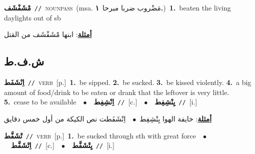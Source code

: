 \documentclass[10pt,a4paper,twoside]{article} %
\begin{document}
\begin{multicols}{2}
{\setlength\topsep{0pt}\textbf{\foreignlanguage{arabic}{مْشَفْشَف}}\ {\color{gray}\texttt{//}\color{black}}\ \textsc{noun\textunderscore pass}\ \color{gray}(msa. \foreignlanguage{arabic}{مَضْروب ضربا مبرحا}~\foreignlanguage{arabic}{\textbf{١.}})\color{black}\ \textbf{1.}~beaten the living daylights out of sb\  \begin{flushright}\color{gray}\foreignlanguage{arabic}{\textbf{\underline{\foreignlanguage{arabic}{أمثلة}}}: ابنها مْشَفْشَف من القتل}\end{flushright}\color{black}} \vspace{2mm}

\vspace{-3mm}
\subsection*{\color{blue}\foreignlanguage{arabic}{ش.ف.ط}\color{blue}{}} 

{\setlength\topsep{0pt}\textbf{\foreignlanguage{arabic}{اِنْشَفَط}}\ {\color{gray}\texttt{//}\color{black}}\ \textsc{verb}\ [p.]\ \textbf{1.}~be sipped.  \textbf{2.}~be sucked.  \textbf{3.}~be kissed violently.  \textbf{4.}~a big amount of food/drink to be eaten or drank that the leftover is very little.  \textbf{5.}~cease to be available\ \ $\bullet$\ \ \setlength\topsep{0pt}\textbf{\foreignlanguage{arabic}{اِنْشِفِط}}\ {\color{gray}\texttt{//}\color{black}}\ [c.]\ \ $\bullet$\ \ \setlength\topsep{0pt}\textbf{\foreignlanguage{arabic}{يِنْشِفِط}}\ {\color{gray}\texttt{//}\color{black}}\ [i.]\  \begin{flushright}\color{gray}\foreignlanguage{arabic}{\textbf{\underline{\foreignlanguage{arabic}{أمثلة}}}: خايفة الهوا يِنْشِفِط\ $\bullet$\ \  اِنْشَفَطت نص الكيكة من أول خمس دقايق}\end{flushright}\color{black}} \vspace{2mm}

{\setlength\topsep{0pt}\textbf{\foreignlanguage{arabic}{تْشَفَّط}}\ {\color{gray}\texttt{//}\color{black}}\ \textsc{verb}\ [p.]\ \textbf{1.}~be sucked through sth with great force\ \ $\bullet$\ \ \setlength\topsep{0pt}\textbf{\foreignlanguage{arabic}{اِتْشَفَّط}}\ {\color{gray}\texttt{//}\color{black}}\ [c.]\ \ $\bullet$\ \ \setlength\topsep{0pt}\textbf{\foreignlanguage{arabic}{يِتْشَفَّط}}\ {\color{gray}\texttt{//}\color{black}}\ [i.]\ } \vspace{2mm}


\end{multicols}
\end{document}
